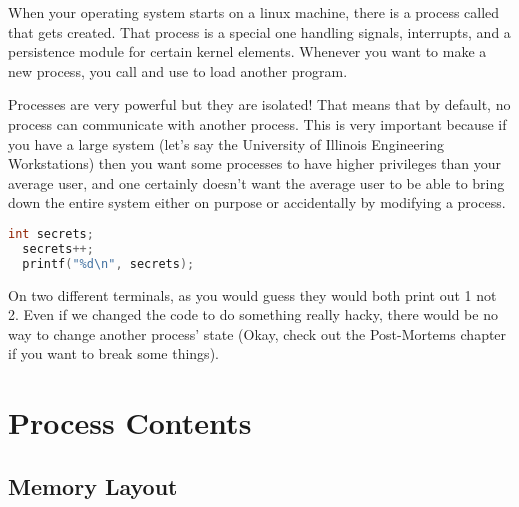 When your operating system starts on a linux machine, there is a process called  that gets created. That process is a special one handling signals, interrupts, and a persistence module for certain kernel elements. Whenever you want to make a new process, you call  and use  to load another program.

Processes are very powerful but they are isolated! That means that by default, no process can communicate with another process.
This is very important because if you have a large system (let's say the University of Illinois Engineering Workstations) then you want some processes to have higher privileges than your average user, and one certainly doesn't want the average user to be able to bring down the entire system either on purpose or accidentally by modifying a process.

\begin{lstlisting}[language=C]
  int secrets;
  secrets++;
  printf("%d\n", secrets);
\end{lstlisting}

On two different terminals, as you would guess they would both print out 1 not 2. Even if we changed the code to do something really hacky, there would be no way to change another process' state (Okay, check out the Post-Mortems chapter if you want to break some things).

\section{Process Contents}

\subsection{Memory Layout}

